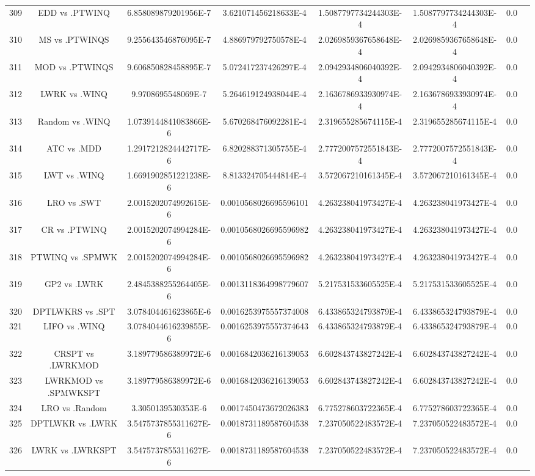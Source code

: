 \documentclass[a3paper,10pt]{article}
\begin{document}
\begin{table}[!htp]
\begin{tabular}{cccccccc}
309&EDD vs .PTWINQ&6.858089879201956E-7&3.621071456218633E-4&1.5087797734244303E-4&1.5087797734244303E-4&0.0\\
310&MS vs .PTWINQS&9.255643546876095E-7&4.886979792750578E-4&2.0269859367658648E-4&2.0269859367658648E-4&0.0\\
311&MOD vs .PTWINQS&9.606850828458895E-7&5.072417237426297E-4&2.0942934806040392E-4&2.0942934806040392E-4&0.0\\
312&LWRK vs .WINQ&9.9708695548069E-7&5.264619124938044E-4&2.1636786933930974E-4&2.1636786933930974E-4&0.0\\
313&Random vs .WINQ&1.0739144841083866E-6&5.670268476092281E-4&2.319655285674115E-4&2.319655285674115E-4&0.0\\
314&ATC vs .MDD&1.2917212824442717E-6&6.820288371305755E-4&2.7772007572551843E-4&2.7772007572551843E-4&0.0\\
315&LWT vs .WINQ&1.6691902851221238E-6&8.813324705444814E-4&3.572067210161345E-4&3.572067210161345E-4&0.0\\
316&LRO vs .SWT&2.0015202074992615E-6&0.0010568026695596101&4.263238041973427E-4&4.263238041973427E-4&0.0\\
317&CR vs .PTWINQ&2.0015202074994284E-6&0.0010568026695596982&4.263238041973427E-4&4.263238041973427E-4&0.0\\
318&PTWINQ vs .SPMWK&2.0015202074994284E-6&0.0010568026695596982&4.263238041973427E-4&4.263238041973427E-4&0.0\\
319&GP2 vs .LWRK&2.4845388255264405E-6&0.0013118364998779607&5.217531533605525E-4&5.217531533605525E-4&0.0\\
320&DPTLWKRS vs .SPT&3.078404461623865E-6&0.0016253975557374008&6.433865324793879E-4&6.433865324793879E-4&0.0\\
321&LIFO vs .WINQ&3.0784044616239855E-6&0.0016253975557374643&6.433865324793879E-4&6.433865324793879E-4&0.0\\
322&CRSPT vs .LWRKMOD&3.189779586389972E-6&0.0016842036216139053&6.602843743827242E-4&6.602843743827242E-4&0.0\\
323&LWRKMOD vs .SPMWKSPT&3.189779586389972E-6&0.0016842036216139053&6.602843743827242E-4&6.602843743827242E-4&0.0\\
324&LRO vs .Random&3.3050139530353E-6&0.0017450473672026383&6.775278603722365E-4&6.775278603722365E-4&0.0\\
325&DPTLWKR vs .LWRK&3.5475737855311627E-6&0.0018731189587604538&7.237050522483572E-4&7.237050522483572E-4&0.0\\
326&LWRK vs .LWRKSPT&3.5475737855311627E-6&0.0018731189587604538&7.237050522483572E-4&7.237050522483572E-4&0.0\\

\end{tabular}
\end{table}
\end{document}
